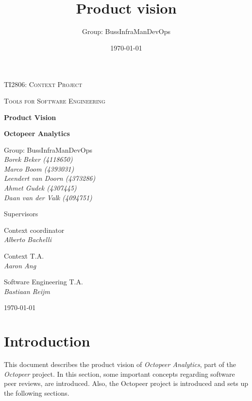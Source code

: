 \documentclass{article}
\title{Product vision}
\author{Group: BussInfraManDevOps}
\date{\today}
\begin{document}
\begin{titlepage}
	\centering
	{\scshape\LARGE TI2806: Context Project \par}
	\vspace{0.2cm}
	{\scshape\Large Tools for Software Engineering\par}
	\vspace{1.5cm}
	{\Huge\bfseries Product Vision\par}
	\vspace{0.5cm}
	{\LARGE\bfseries Octopeer Analytics\par}
	\vspace{3cm}
	{\LARGE
	  Group: BussInfraManDevOps \\
	  \vspace{0.4cm}
	  \Large
	  \itshape
        Borek Beker \textnormal{(4118650)}\\
        Marco Boom \textnormal{(4393031)}\\
        Leendert van Doorn \textnormal{(4373286)}\\
        Ahmet Gudek \textnormal{(4307445)}\\
        Daan van der Valk \textnormal{(4094751)}\\
    \par}
	\vspace{1cm}
	{\LARGE
	  Supervisors \\
	  \Large
        
        \begin{multicols}{3}
        Context coordinator\\
        \textit{Alberto Bachelli}
        \columnbreak
        
        Context T.A.\\
        \textit{Aaron Ang}\\
        \columnbreak
        
        Software Engineering T.A.\\
        \textit{Bastiaan Reijm}\\
        \end{multicols}
    \par}

	\vfill

	{\large \today\par}
\end{titlepage}

\tableofcontents
\newpage


\setlength{\parindent}{0em}
\setlength{\parskip}{1em}
\section{Introduction} \label{section:introduction}
This document describes the product vision of \textit{Octopeer Analytics}, part of the \textit{Octopeer} project. In this section, some important concepts regarding software peer reviews, are introduced. Also, the Octopeer project is introduced and sets up the following sections.
\end{document}
